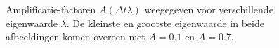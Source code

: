 \begin{figure}[H]
  \centering
  \hfill
  \caption{Amplificatie-factoren $A(\Delta t \lambda)$ weegegeven voor verschillende eigenwaarde $\lambda$. De kleinste en grootste eigenwaarde in beide afbeeldingen komen overeen met $A=0.1$ en $A=0.7$.}
  \label{fig:AF}
\end{figure}